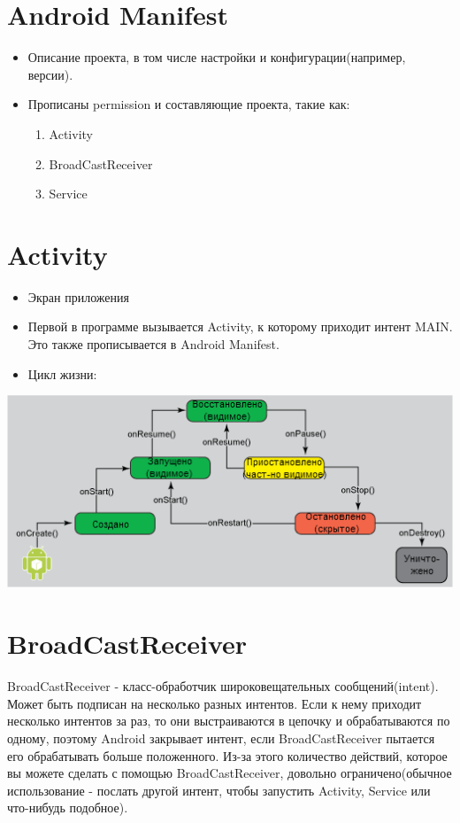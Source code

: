 \documentclass[12 pt]{article}
\begin{document}
\section{Android Manifest}
    \begin{itemize}
    	\item Описание проекта, в том числе настройки и конфигурации(например, версии).
    	\item Прописаны permission и составляющие проекта, такие как:
		\begin{enumerate}
        	\item Activity 
        	\item BroadCastReceiver 
        	\item Service
        \end{enumerate}
    \end{itemize}

\section{Activity}
    \begin{itemize}
    	\item Экран приложения
        \item Первой в программе вызывается Activity, к которому приходит интент MAIN. Это также прописывается в Android Manifest.
    	\item Цикл жизни:
   	\end{itemize}
	\includegraphics{LifeCycle.png}
    
\section{BroadCastReceiver} 
    
    BroadCastReceiver - класс-обработчик широковещательных сообщений(intent). Может быть подписан на несколько разных интентов. Если к нему приходит несколько интентов за раз, то они выстраиваются в цепочку и обрабатываются по одному, поэтому Android закрывает интент, если BroadCastReceiver пытается его обрабатывать больше положенного. Из-за этого количество действий, которое вы можете сделать с помощью BroadCastReceiver, довольно ограничено(обычное использование - послать другой интент, чтобы запустить Activity, Service или что-нибудь подобное).
    
\end{document}
